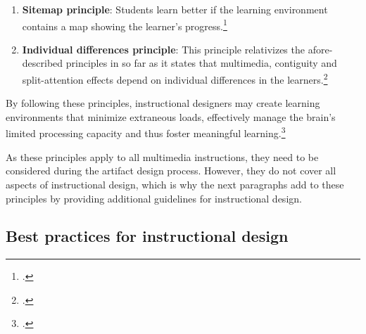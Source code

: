 \begin{enumerate}
    \item \textbf{Sitemap principle}: Students learn better if the learning environment contains a map showing the learner's progress.\footcites[Cf.][p.7]{MayerMultimediaLearning2009}
  \item \textbf{Individual differences principle}: This principle relativizes the afore-described principles in so far as it states that multimedia, contiguity and split-attention effects depend on individual differences in the learners.\footcites[Cf.][p.15]{MayerCognitiveTheoryMultimedia1999}
\end{enumerate}
By following these principles, instructional designers may create learning environments that minimize extraneous loads, effectively manage the brain's limited processing capacity and thus foster meaningful learning.\footcites[Cf.][chapter 2, paragraph 6]{ClarkElearningscienceinstruction2016}

As these principles apply to all multimedia instructions, they need to be considered during the artifact design process. However, they do not cover all aspects of instructional design, which is why the next paragraphs add to these principles by providing additional guidelines for instructional design.

\subsection{Best practices for instructional design} \label{subsec:BestPracticesDesign}

